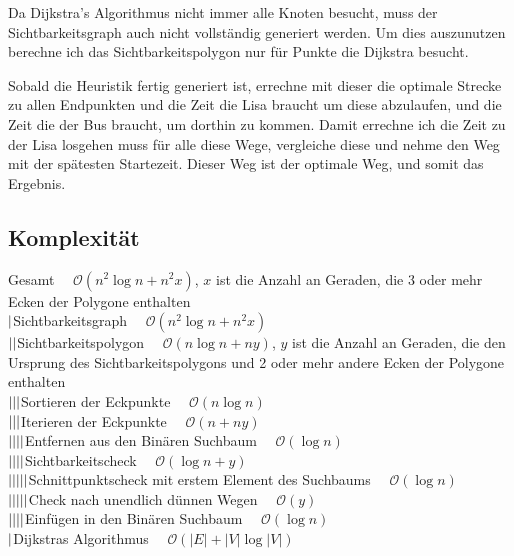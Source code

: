 \documentclass[12pt]{article}
\begin{document}
Da Dijkstra's Algorithmus nicht immer alle Knoten besucht, muss der Sichtbarkeitsgraph auch nicht vollständig generiert werden. Um dies auszunutzen berechne ich das Sichtbarkeitspolygon nur für Punkte die Dijkstra besucht.

Sobald die Heuristik fertig generiert ist, errechne mit dieser die optimale Strecke zu allen Endpunkten und die Zeit die Lisa braucht um diese abzulaufen, und die Zeit die der Bus braucht, um dorthin zu kommen. Damit errechne ich die Zeit zu der Lisa losgehen muss für alle diese Wege, vergleiche diese und nehme den Weg mit der spätesten Startezeit. Dieser Weg ist der optimale Weg, und somit das Ergebnis.

\newpage
\subsection{Komplexität}
\newcommand{\bigO}{\mathcal{O}}
\newcommand{\n}{n}
\newcommand{\m}{\large\vert}
\newcommand{\spacer}{$\quad$}
Gesamt \spacer $\bigO(\n^2\log\n + \n^2x)$, $x$ ist die Anzahl an Geraden, die 3 oder mehr Ecken der Polygone enthalten \\
$\m$Sichtbarkeitsgraph \spacer $\bigO(\n^2\log\n + \n^2x)$ \\
$\m\m$Sichtbarkeitspolygon \spacer $\bigO(\n\log\n + \n y)$, $y$ ist die Anzahl an Geraden, die den Ursprung des Sichtbarkeitspolygons und 2 oder mehr andere Ecken der Polygone enthalten \\
$\m\m\m$Sortieren der Eckpunkte \spacer $\bigO(\n\log\n)$ \\
$\m\m\m$Iterieren der Eckpunkte \spacer $\bigO(\n + \n y)$ \\
$\m\m\m\m$Entfernen aus den Binären Suchbaum \spacer $\bigO(\log\n)$ \\
$\m\m\m\m$Sichtbarkeitscheck \spacer $\bigO(\log\n + y)$ \\
$\m\m\m\m\m$Schnittpunktscheck mit erstem Element des Suchbaums \spacer $\bigO(\log\n)$ \\
$\m\m\m\m\m$Check nach unendlich dünnen Wegen \spacer $\bigO(y)$ \\
$\m\m\m\m$Einfügen in den Binären Suchbaum \spacer $\bigO(\log\n)$ \\
$\m$Dijkstras Algorithmus \spacer $\bigO(|E|+|V|\log |V|)$ \\

\newcommand{\ExNoPage}[3]{
\frame{\texttt{[image: \#2]}}
\captionof{figure}{#3}
}
\newcommand{\Ex}[3]{
\begin{minipage}{0.48\textwidth}
\ExNoPage{#1}{#2}{#3}
\end{minipage}
}
\end{document}

